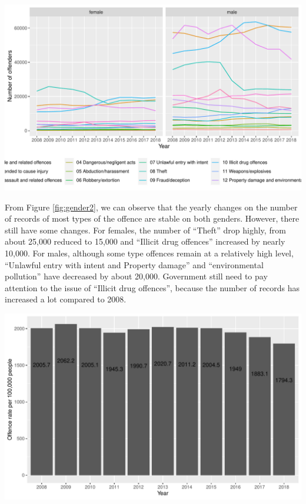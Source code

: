 \documentclass[11pt,a4paper,]{article}
\let\origfigure\figure
\let\endorigfigure\endfigure
\renewenvironment{figure}[1][2] {
\expandafter\origfigure\expandafter[H]
} {
\endorigfigure
}
\begin{document}
\begin{figure}
\centering
\includegraphics{ETC5513-Assignment4_files/figure-latex/gender2-1.pdf}
\caption{\label{fig:gender2}Yearly Number of Offenders on Female and Male}
\end{figure}

From Figure \ref{fig:gender2}, we can observe that the yearly changes on the number of records of most types of the offence are stable on both genders. However, there still have some changes. For females, the number of ``Theft'' drop highly, from about 25,000 reduced to 15,000 and ``Illicit drug offences'' increased by nearly 10,000. For males, although some type offences remain at a relatively high level, ``Unlawful entry with intent and Property damage'' and ``environmental pollution'' have decreased by about 20,000. Government still need to pay attention to the issue of ``Illicit drug offences'', because the number of records has increased a lot compared to 2008.

\begin{figure}
\centering
\includegraphics{ETC5513-Assignment4_files/figure-latex/gender3-1.pdf}
\caption{\label{fig:gender3}Rate of offenders recorded in Australia}
\end{figure}
\end{document}
